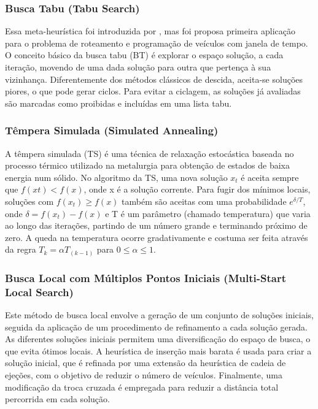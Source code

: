 \subsubsection{Busca Tabu (Tabu Search)}

Essa meta-heurística foi introduzida por \cite{Glover}, mas foi \cite{Garcia} proposa primeira aplicação para o problema de roteamento e programação de veículos com janela de tempo. O conceito básico da busca tabu (BT) é explorar o espaço solução, a cada iteração, movendo de uma dada solução para outra que pertença à sua vizinhança. Diferentemente dos métodos clássicos de descida, aceita-se soluções piores, o que pode gerar ciclos. Para evitar a ciclagem, as soluções já avaliadas são marcadas como proibidas e incluídas em uma lista tabu.

\subsubsection{Têmpera Simulada (Simulated Annealing)}

A têmpera simulada (TS) é uma técnica de relaxação estocástica baseada no processo térmico utilizado na metalurgia para obtenção de estados de baixa energia num sólido.  No algoritmo da TS,  uma nova solução \(x_t\) é aceita sempre que \(f(xt) < f(x)\), onde x é a solução corrente. Para fugir dos mínimos locais, soluções com \(f(x_t) \geq f(x)\) também são aceitas com uma probabilidade \(e^{\delta/T}\), onde \(\delta = f(x_t) - f(x)\) e T é um parâmetro (chamado temperatura) que varia ao longo das iterações, partindo de um número grande e terminando próximo de zero. A queda na temperatura ocorre gradativamente e costuma ser feita através da regra  \(T_k = \alpha T_(k-1)\) para \(0 \leq \alpha \leq 1\). \cite{Russell}


\subsubsection{Busca Local com Múltiplos Pontos Iniciais (Multi-Start Local Search)}

Este método de busca local envolve a geração de um conjunto de soluções iniciais, seguida da aplicação de um procedimento de refinamento a cada solução gerada. As diferentes soluções iniciais permitem uma diversificação do espaço de busca, o que evita ótimos locais. A heurística de inserção mais barata é usada para criar a solução inicial, que é refinada por uma extensão da heurística de cadeia de ejeções, com o objetivo de reduzir o número de veículos. Finalmente, uma modificação da troca cruzada é empregada para reduzir a distância total percorrida em cada solução. \cite{Dullaert}

